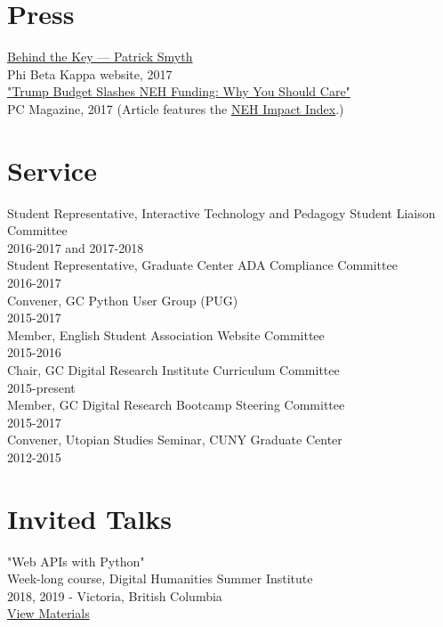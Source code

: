 \documentclass[11pt]{article}
\begin{document}
\section*{Press}
\label{sec:orgheadline4}
\href{http://behindthekey.tumblr.com/post/167060957444/patrick-smyth}{Behind the Key — Patrick Smyth}\\
Phi Beta Kappa website, 2017\\

\href{http://www.pcmag.com/commentary/353904/trump-budget-slashes-neh-funding-why-you-should-care}{"Trump Budget Slashes NEH Funding: Why You Should Care"}\\
PC Magazine, 2017 (Article features the \href{http://www.nehimpact.org/}{NEH Impact Index}.)\\

\section*{Service}
\label{sec:orgheadline5}
Student Representative, Interactive Technology and Pedagogy Student Liaison Committee\\
2016-2017 and 2017-2018\\

Student Representative, Graduate Center ADA Compliance Committee\\
2016-2017\\

Convener, GC Python User Group (PUG)\\
2015-2017\\

Member, English Student Association Website Committee\\
2015-2016\\

Chair, GC Digital Research Institute Curriculum Committee\\
2015-present\\

Member, GC Digital Research Bootcamp Steering Committee\\
2015-2017\\

Convener, Utopian Studies Seminar, CUNY Graduate Center\\
2012-2015\\
\section*{Invited Talks}
\label{sec:orgheadline6}
"Web APIs with Python"\\
Week-long course, Digital Humanities Summer Institute\\
2018, 2019 - Victoria, British Columbia\\
\href{https://github.com/szweibel/DHSI-API-workshop#web-apis-with-python}{View Materials}\\
\end{document}
